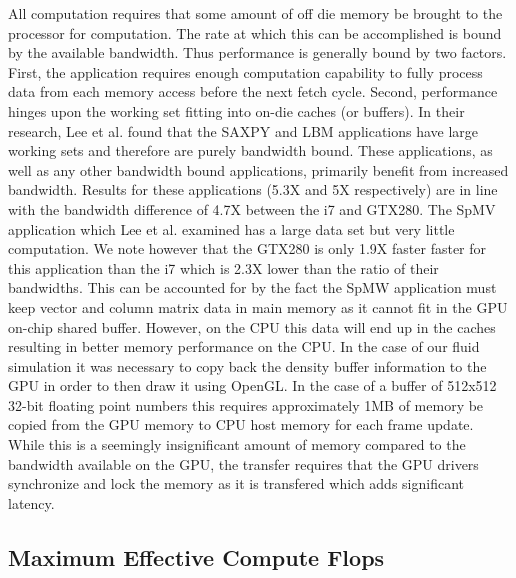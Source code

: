 \documentclass[conference]{IEEEtran}
\begin{document}
All computation requires that some amount of off die memory be brought to the processor for computation. The rate at which this can be accomplished is bound by the available bandwidth. Thus performance is generally bound by two factors. First, the application requires enough computation capability to fully process data from each memory access before the next fetch cycle. Second, performance hinges upon the working set fitting into on-die caches (or buffers). In their research, Lee et al. found that the SAXPY and LBM applications have large working sets and therefore are purely bandwidth bound. These applications, as well as any other bandwidth bound applications, primarily benefit from increased bandwidth. Results for these applications (5.3X and 5X respectively) are in line with the bandwidth difference of 4.7X between the i7 and GTX280. The SpMV application which Lee et al. examined has a large data set but very little computation. We note however that the GTX280 is only 1.9X faster faster for this application than the i7 which is 2.3X lower than the ratio of their bandwidths. This can be accounted for by the fact the SpMW application must keep vector and column matrix data in main memory as it cannot fit in the GPU on-chip shared buffer. However, on the CPU this data will end up in the caches resulting in better memory performance on the CPU. In the case of our fluid simulation it was necessary to copy back the density buffer information to the GPU in order to then draw it using OpenGL. In the case of a buffer of 512x512 32-bit floating point numbers this requires approximately 1MB of memory be copied from the GPU memory to CPU host memory for each frame update. While this is a seemingly insignificant amount of memory compared to the bandwidth available on the GPU, the transfer requires that the GPU drivers synchronize and lock the memory as it is transfered which adds significant latency. 

\subsection{Maximum Effective Compute Flops}
\end{document}

